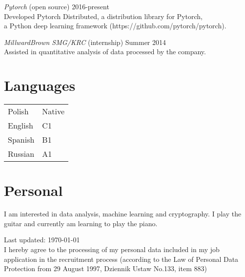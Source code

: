 \documentclass[margin, 10pt]{res} %
\begin{document}
\begin{resume}
{\sl Pytorch} (open source) \hfill {2016-present} \\
Developed Pytorch Distributed, a distribution library for Pytorch,\\ a Python deep
learning framework (https://github.com/pytorch/pytorch).

{\sl MillwardBrown SMG/KRC} (internship) \hfill Summer 2014\\
Assisted in quantitative analysis of data processed by the company.


\section{Languages}
\begin{tabular}{@{}ll}
Polish & Native\\
English & C1\\
Spanish & B1\\
Russian & A1
\end{tabular}


\section{Personal} 
I am interested in data analysis, machine learning and cryptography.
I play the guitar and currently am learning to play the piano.


\begin{center}
  \begin{footnotesize}
    Last updated: \today \\
      \tiny{I hereby agree to the processing of my personal data included in my job application in the recruitment process (according to the Law of Personal Data Protection from 29 August 1997, Dziennik Ustaw No.133, item 883)}
  \end{footnotesize}
\end{center}

\end{resume}
\end{document}
